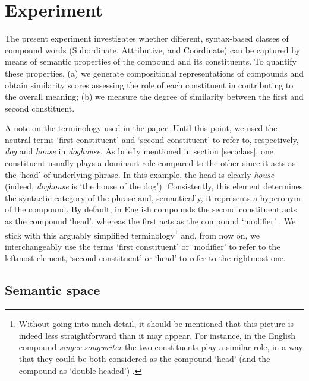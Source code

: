 \documentclass[output=paper]{langsci/langscibook}
\begin{document}

\section{Experiment}
\label{sec:experiments}

The present experiment investigates whether different, syntax-based classes of compound words (Subordinate, Attributive, and Coordinate) can be captured by means of semantic properties of the compound and its constituents. To quantify these properties, (a) we generate compositional representations of compounds and obtain similarity scores assessing the role of each constituent in contributing to the overall meaning; (b) we measure the degree of similarity between the first and second constituent.

A note on the terminology used in the paper. Until this point, we used the neutral terms `first constituent' and `second constituent' to refer to, respectively, \emph{dog} and \emph{house} in \emph{doghouse}. As briefly mentioned in section \ref{sec:class}, one constituent usually plays a dominant role compared to the other since it acts as the `head' of underlying phrase. In this example, the head is clearly \emph{house} (indeed, \emph{doghouse} is `the house of the dog'). Consistently, this element determines the syntactic category of the phrase and, semantically, it represents a hyperonym of the compound. By default, in English compounds the second constituent acts as the compound `head', whereas the first acts as the compound `modifier' \citep{bauerOHC}. We stick with this arguably simplified terminology\footnote{Without going into much detail, it should be mentioned that this picture is indeed less straightforward than it may appear. For instance, in the English compound \emph{singer-songwriter} the two constituents play a similar role, in a way that they could be both considered as the compound `head' (and the compound as `double-headed') \citep{bauerOHC}.} and, from now on, we interchangeably use the terms `first constituent' or `modifier' to refer to the leftmost element, `second constituent' or `head' to refer to the rightmost one.


\subsection{Semantic space}\label{sec:vectors}
\end{document}
